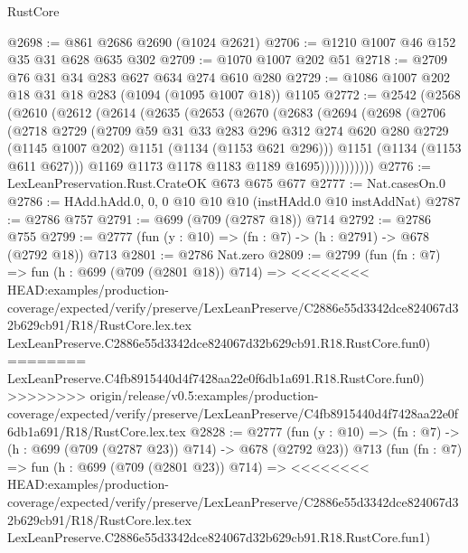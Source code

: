 \begin{lexlean}{RustCore}
\begin{coremodule}
{\begin{coremodule}
{{{{{{{{{@2698 := @861 @2686 @2690 (@1024 @2621)
@2706 := @1210 @1007 @46 @152 @35 @31 @628 @635 @302
@2709 := @1070 @1007 @202 @51
@2718 := @2709 @76 @31 @34 @283 @627 @634 @274 @610 @280
@2729 := @1086 @1007 @202 @18 @31 @18 @283 (@1094 (@1095 @1007 @18)) @1105
@2772 := @2542
    (@2568
      (@2610
        (@2612
          (@2614
            (@2635
              (@2653
                (@2670
                  (@2683
                    (@2694
                      (@2698
                        (@2706
                          (@2718
                            @2729
                            (@2709
                              @59
                              @31
                              @33
                              @283
                              @296
                              @312
                              @274
                              @620
                              @280
                              @2729
                              (@1145 @1007 @202)
                              @1151
                              (@1134 (@1153 @621 @296)))
                            @1151
                            (@1134 (@1153 @611 @627)))
                          @1169
                          @1173
                          @1178
                          @1183
                          @1189
                          @1695)))))))))))
@2776 := LexLeanPreservation.Rust.CrateOK @673 @675 @677
@2777 := Nat.casesOn.{0}
@2786 := HAdd.hAdd.{0, 0, 0} @10 @10 @10 (instHAdd.{0} @10 instAddNat)
@2787 := @2786 @757
@2791 := @699 (@709 (@2787 @18)) @714
@2792 := @2786 @755
@2799 := @2777 (fun (y : @10) => (fn : @7) -> (h : @2791) -> @678 (@2792 @18)) @713
@2801 := @2786 Nat.zero
@2809 := @2799
    (fun (fn : @7) =>
    fun (h : @699 (@709 (@2801 @18)) @714) =>
<<<<<<<< HEAD:examples/production-coverage/expected/verify/preserve/LexLeanPreserve/C2886e55d3342dce824067d32b629cb91/R18/RustCore.lex.tex
    LexLeanPreserve.C2886e55d3342dce824067d32b629cb91.R18.RustCore.fun0)
========
    LexLeanPreserve.C4fb8915440d4f7428aa22e0f6db1a691.R18.RustCore.fun0)
>>>>>>>> origin/release/v0.5:examples/production-coverage/expected/verify/preserve/LexLeanPreserve/C4fb8915440d4f7428aa22e0f6db1a691/R18/RustCore.lex.tex
@2828 := @2777
    (fun (y : @10) => (fn : @7) -> (h : @699 (@709 (@2787 @23)) @714) -> @678 (@2792 @23))
    @713
    (fun (fn : @7) =>
    fun (h : @699 (@709 (@2801 @23)) @714) =>
<<<<<<<< HEAD:examples/production-coverage/expected/verify/preserve/LexLeanPreserve/C2886e55d3342dce824067d32b629cb91/R18/RustCore.lex.tex
    LexLeanPreserve.C2886e55d3342dce824067d32b629cb91.R18.RustCore.fun1)
}}}}}}}}}
\end{coremodule}}
\end{coremodule}
\end{lexlean}
